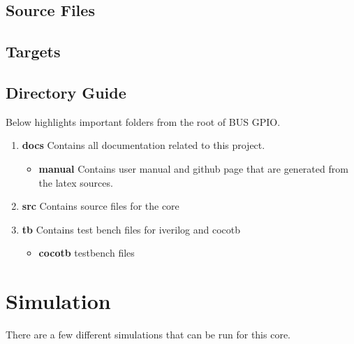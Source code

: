 \subsection{Source Files}







\subsection{Targets}







\subsection{Directory Guide}

\par
Below highlights important folders from the root of BUS GPIO.

\begin{enumerate}
  \item \textbf{docs} Contains all documentation related to this project.
    \begin{itemize}
      \item \textbf{manual} Contains user manual and github page that are generated from the latex sources.
    \end{itemize}
  \item \textbf{src} Contains source files for the core
  \item \textbf{tb} Contains test bench files for iverilog and cocotb
    \begin{itemize}
      \item \textbf{cocotb} testbench files
    \end{itemize}
\end{enumerate}

\newpage

\section{Simulation}
\par
There are a few different simulations that can be run for this core.

